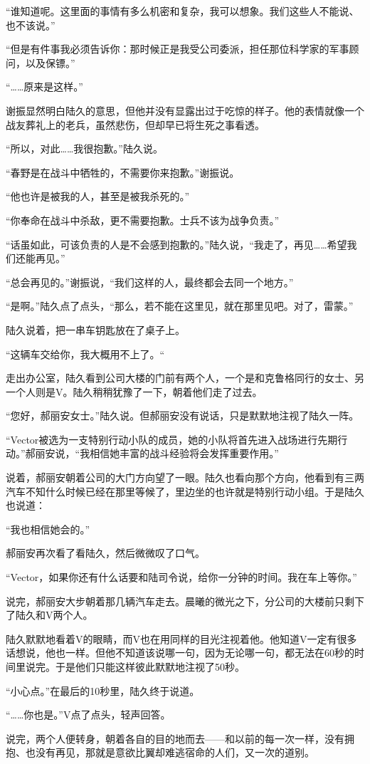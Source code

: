 “谁知道呢。这里面的事情有多么机密和复杂，我可以想象。我们这些人不能说、也不该说。”

“但是有件事我必须告诉你：那时候正是我受公司委派，担任那位科学家的军事顾问，以及保镖。”

“……原来是这样。”

谢振显然明白陆久的意思，但他并没有显露出过于吃惊的样子。他的表情就像一个战友葬礼上的老兵，虽然悲伤，但却早已将生死之事看透。

“所以，对此……我很抱歉。”陆久说。

“春野是在战斗中牺牲的，不需要你来抱歉。”谢振说。

“他也许是被我的人，甚至是被我杀死的。”

“你奉命在战斗中杀敌，更不需要抱歉。士兵不该为战争负责。”

“话虽如此，可该负责的人是不会感到抱歉的。”陆久说，“我走了，再见……希望我们还能再见。”

“总会再见的。”谢振说，“我们这样的人，最终都会去同一个地方。”

“是啊。”陆久点了点头，“那么，若不能在这里见，就在那里见吧。对了，雷蒙。”

陆久说着，把一串车钥匙放在了桌子上。

“这辆车交给你，我大概用不上了。“

走出办公室，陆久看到公司大楼的门前有两个人，一个是和克鲁格同行的女士、另一个人则是V。陆久稍稍犹豫了一下，朝着他们走了过去。

“您好，郝丽安女士。”陆久说。但郝丽安没有说话，只是默默地注视了陆久一阵。

“Vector被选为一支特别行动小队的成员，她的小队将首先进入战场进行先期行动。”郝丽安说，“我相信她丰富的战斗经验将会发挥重要作用。”

说着，郝丽安朝着公司的大门方向望了一眼。陆久也看向那个方向，他看到有三两汽车不知什么时候已经在那里等候了，里边坐的也许就是特别行动小组。于是陆久也说道：

“我也相信她会的。”

郝丽安再次看了看陆久，然后微微叹了口气。

“Vector，如果你还有什么话要和陆司令说，给你一分钟的时间。我在车上等你。”

说完，郝丽安大步朝着那几辆汽车走去。晨曦的微光之下，分公司的大楼前只剩下了陆久和V两个人。

陆久默默地看着V的眼睛，而V也在用同样的目光注视着他。他知道V一定有很多话想说，他也一样。但他不知道该说哪一句，因为无论哪一句，都无法在60秒的时间里说完。于是他们只能这样彼此默默地注视了50秒。

“小心点。”在最后的10秒里，陆久终于说道。

“……你也是。”V点了点头，轻声回答。

说完，两个人便转身，朝着各自的目的地而去——和以前的每一次一样，没有拥抱、也没有再见，那就是意欲比翼却难逃宿命的人们，又一次的道别。

